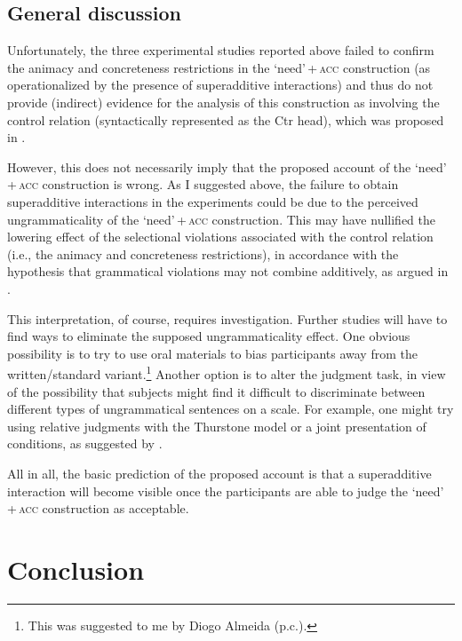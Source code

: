 \documentclass[output=paper]{langscibook}
\begin{document}
\subsection{General discussion}

Unfortunately, the three experimental studies reported above failed to confirm the animacy and concreteness restrictions in the `need'\,+\,\textsc{acc} construction (as operationalized by the presence of superadditive interactions) and thus do not provide (indirect) evidence for the analysis of this construction as involving the control relation (syntactically represented as the Ctr head), which was proposed in .

However, this does not necessarily imply that the proposed account of the `need'\,+\,\textsc{acc} construction is wrong. As I suggested above, the failure to obtain superadditive interactions in the experiments could be due to the perceived ungrammaticality of the `need'\,+\,\textsc{acc} construction. This may have nullified the lowering effect of the selectional violations associated with the control relation (i.e., the animacy and concreteness restrictions), in accordance with the hypothesis that grammatical violations may not combine additively, as argued in \citet{Hofmeister.Casasanto.Staum.Sag2014}.

This interpretation, of course, requires investigation. Further studies will have to find ways to eliminate the supposed ungrammaticality effect. One obvious possibility is to try to use oral materials to bias participants away from the written/standard variant.\footnote{This was suggested to me by Diogo Almeida (p.c.).} Another option is to alter the judgment task, in view of the possibility that subjects might find it difficult to discriminate between different types of ungrammatical sentences on a scale. For example, one might try using relative judgments with the Thurstone model \citep[see][]{Langsford.etal2018} or a joint presentation of conditions, as suggested by \citet{Marty.Chemla.Sprouse2020}.

All in all, the basic prediction of the proposed account is that a superadditive interaction will become visible once the participants are able to judge the `need'\,+\,\textsc{acc} construction as acceptable.

\section{Conclusion\label{section-conclusion}}
\end{document}
